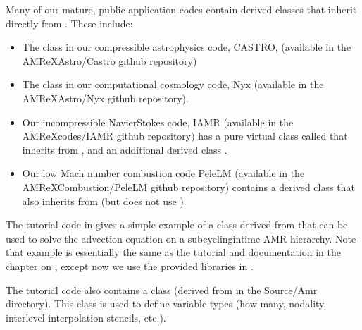\documentclass[letterpaper,10pt,english]{sphinxmanual}
\begin{document}
\sphinxAtStartPar
Many of our mature, public application codes contain derived classes that
inherit directly from . These include:
\begin{itemize}
\item {} 
\sphinxAtStartPar
The  class in our compressible astrophysics code, CASTRO,
(available in the AMReX\sphinxhyphen{}Astro/Castro github repository)

\item {} 
\sphinxAtStartPar
The  class in our computational cosmology code, Nyx
(available in the AMReX\sphinxhyphen{}Astro/Nyx github repository).

\item {} 
\sphinxAtStartPar
Our incompressible Navier\sphinxhyphen{}Stokes code, IAMR
(available in the AMReX\sphinxhyphen{}codes/IAMR github repository) has a pure virtual
class called  that inherits from , and an
additional derived class .

\item {} 
\sphinxAtStartPar
Our low Mach number combustion code PeleLM
(available in the AMReX\sphinxhyphen{}Combustion/PeleLM github repository)
contains a derived class  that also inherits from
 (but does not use ).

\end{itemize}

\sphinxAtStartPar
The tutorial code in  gives a simple
example of a class derived from  that can be used to solve the
advection equation on a subcycling\sphinxhyphen{}in\sphinxhyphen{}time AMR hierarchy. Note that example is
essentially the same as the  tutorial and
documentation in the chapter on {\hyperref[\detokenize{AmrCore_Chapter:chap-amrcore}]{}}, except now we use the
provided libraries in .

\sphinxAtStartPar
The tutorial code also contains a  class (derived from
 in the Source/Amr directory). This class is used to define
variable types (how many, nodality, interlevel interpolation stencils, etc.).
\end{document}
